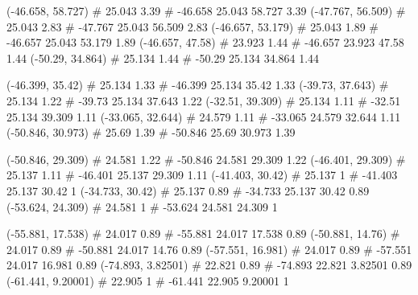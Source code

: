 \documentclass[a4paper,openbib,10pt]{article}
\newenvironment{treegraph}{\begin{graph}}{\end{graph}}
\begin{document}
\begin{treegraph}
  (-46.658, 58.727) #     25.043    3.39
   #    -46.658    25.043    58.727    3.39
  (-47.767, 56.509) #     25.043    2.83
   #    -47.767    25.043    56.509    2.83
  (-46.657, 53.179) #     25.043    1.89
   #    -46.657    25.043    53.179    1.89
  (-46.657, 47.58) #     23.923    1.44
   #    -46.657    23.923    47.58    1.44
  (-50.29, 34.864) #     25.134    1.44
   #    -50.29    25.134    34.864    1.44

  (-46.399, 35.42) #     25.134    1.33
   #    -46.399    25.134    35.42    1.33
  (-39.73, 37.643) #     25.134    1.22
   #    -39.73    25.134    37.643    1.22
  (-32.51, 39.309) #     25.134    1.11
   #    -32.51    25.134    39.309    1.11
  (-33.065, 32.644) #     24.579    1.11
   #    -33.065    24.579    32.644    1.11
  (-50.846, 30.973) #     25.69    1.39
   #    -50.846    25.69    30.973    1.39

  (-50.846, 29.309) #     24.581    1.22
   #    -50.846    24.581    29.309    1.22
  (-46.401, 29.309) #     25.137    1.11
   #    -46.401    25.137    29.309    1.11
  (-41.403, 30.42) #     25.137    1
   #    -41.403    25.137    30.42    1
  (-34.733, 30.42) #     25.137    0.89
   #    -34.733    25.137    30.42    0.89
  (-53.624, 24.309) #     24.581    1
   #    -53.624    24.581    24.309    1

  (-55.881, 17.538) #     24.017    0.89
   #    -55.881    24.017    17.538    0.89
  (-50.881, 14.76) #     24.017    0.89
   #    -50.881    24.017    14.76    0.89
  (-57.551, 16.981) #     24.017    0.89
   #    -57.551    24.017    16.981    0.89
  (-74.893, 3.82501) #     22.821    0.89
   #    -74.893    22.821    3.82501    0.89
  (-61.441, 9.20001) #     22.905    1
   #    -61.441    22.905    9.20001    1


\end{treegraph}
\end{document}

